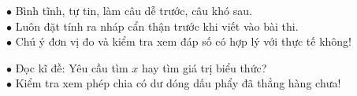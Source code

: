 \documentclass[14pt,a4paper,oneside]{extbook}
\begin{document}
\noindent
\begin{minipage}[t]{0.54\textwidth}
  \begin{tcolorbox}[
    enhanced,
    title={\footnotesize\bfseries\color{white}\faHeart\ Lời dặn dò từ Thầy Lĩnh},
    colback=green!3!white,
    colframe=green!60!black,
    arc=2.5mm, boxrule=0.8pt, top=1.8mm, bottom=1.8mm, left=2.2mm, right=2.2mm
  ]
    \footnotesize
    $\bullet$ Bình tĩnh, tự tin, làm câu dễ trước, câu khó sau.\\
    $\bullet$ Luôn đặt tính ra nháp cẩn thận trước khi viết vào bài thi.\\
    $\bullet$ Chú ý đơn vị đo và kiểm tra xem đáp số có hợp lý với thực tế không!
  \end{tcolorbox}
\end{minipage}%
\hfill
\begin{minipage}[t]{0.44\textwidth}
  \begin{tcolorbox}[
    enhanced,
    title={\footnotesize\bfseries\color{white}\faExclamationTriangle\ Mẹo tránh bẫy trắc nghiệm},
    colback=red!2!white,
    colframe=red!70!black,
    arc=2.5mm, boxrule=0.8pt, top=1.8mm, bottom=1.8mm, left=2.2mm, right=2.2mm
  ]
    \footnotesize
    $\bullet$ Đọc kĩ đề: Yêu cầu tìm $x$ hay tìm giá trị biểu thức?\\
    $\bullet$ Kiểm tra xem phép chia có dư dóng dấu phẩy đã thẳng hàng chưa!
  \end{tcolorbox}
\end{minipage}
\end{document}
